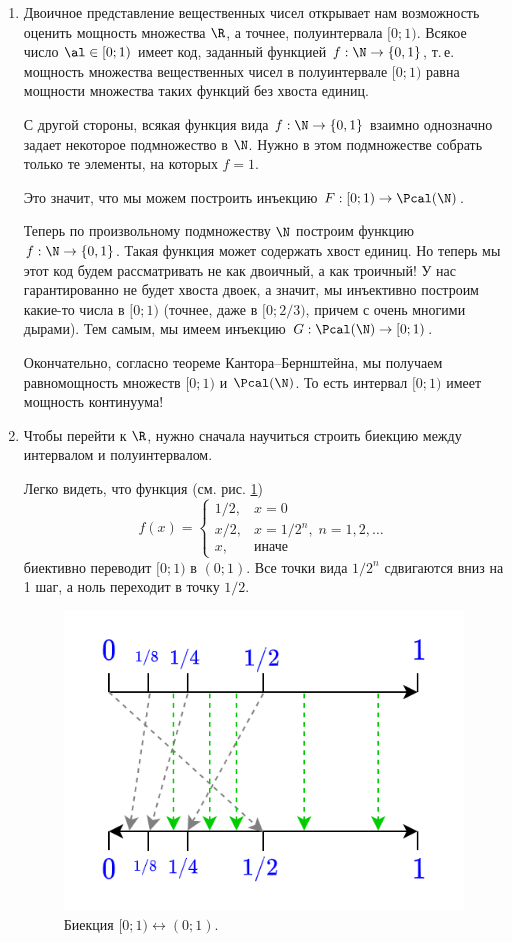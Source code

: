 \begin{enumerate}
\item Двоичное представление вещественных чисел открывает нам возможность оценить мощность множества $\R$, а точнее, полуинтервала $[0;1)$. Всякое число $\al\in[0;1)$ имеет код, заданный функцией $f:\N\to\{0,1\}$, т.\,е. мощность множества вещественных чисел в полуинтервале $[0;1)$ равна мощности множества таких функций без хвоста единиц.

С другой стороны, всякая функция вида $f:\N\to\{0,1\}$ взаимно однозначно задает некоторое подмножество в $\N$. Нужно в этом подмножестве собрать только те элементы, на которых $f=1$.

Это значит, что мы можем построить инъекцию $F:[0;1)\to\Pcal(\N)$.

Теперь по произвольному подмножеству $\N$ построим функцию $f:\N\to\{0,1\}$. Такая функция может содержать хвост единиц. Но теперь мы этот код будем рассматривать не как двоичный, а как троичный! У нас гарантированно не будет хвоста двоек, а значит, мы инъективно построим какие-то числа в $[0;1)$ (точнее, даже в $[0;2/3)$, причем с очень многими дырами). Тем самым, мы имеем инъекцию $G:\Pcal(\N)\to[0;1)$.

Окончательно, согласно теореме Кантора--Бернштейна, мы получаем равномощность множеств $[0;1)$ и $\Pcal(\N)$. То есть интервал $[0;1)$ имеет мощность континуума!
\item Чтобы перейти к $\R$, нужно сначала научиться строить биекцию между интервалом и полуинтервалом.

Легко видеть, что функция (см. рис. \ref{01bijekt})
$$
f(x) = \begin{cases}
1/2, & x=0 \\
x/2, & x=1/2^n,\; n=1,2,\dots \\
x, & \mbox{иначе}
\end{cases}
$$
биективно переводит $[0;1)$ в $(0;1)$. Все точки вида $1/2^n$ сдвигаются вниз на 1 шаг, а ноль переходит в точку $1/2$.

\begin{figure}[hbt!]
\begin{center}
\includegraphics[scale=0.35]{01bijekt.png}
\end{center}\caption{Биекция $[0;1)\leftrightarrow(0;1)$.}\label{01bijekt}
\end{figure}


\end{enumerate}
